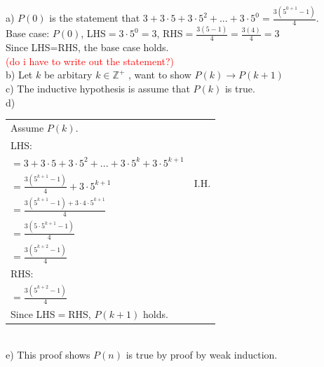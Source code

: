 \documentclass[12pt]{exam}
\begin{document}
\begin{solution}
	a) $P(0)$ is the statement that $3 + 3 \cdot 5 + 3 \cdot 5^2 + ... + 3 \cdot 5^0 = \frac{3 (5^{0+1} - 1)}{4}$.\\
	Base case: $P(0)$, LHS$=3 \cdot 5^0=3$, RHS$=\frac{3(5-1)}{4}=\frac{3(4)}{4}=3$\\
	Since LHS=RHS, the base case holds.\\
	\textcolor{red}{ (do i have to write out the statement?)}
	\\ b) Let $k$ be arbitary $ k \in \mathbb{Z}^+$ , want to show $P(k) \rightarrow P(k+1)$\\
	c) The inductive hypothesis is assume that $P(k)$ is true.\\
	d)\\
	\begin{tabular}{ll}
		Assume $P(k)$.                                                       \\
		LHS:                                                                 \\
		$=3 + 3 \cdot 5 + 3 \cdot 5^2 + ... +3 \cdot 5^{k}+ 3 \cdot 5^{k+1}$ \\
		$=\frac{3 (5^{k+1} - 1)}{4}+3 \cdot 5^{k+1}$ & I.H.                  \\
		$=\frac{3(5^{k+1}-1)+ 3 \cdot 4 \cdot 5^{k+1}}{4}$                   \\
		$=\frac{3(5\cdot 5^{k+1}-1)}{4}$                                     \\
		$=\frac{3(5^{k+2}-1)}{4}$                                            \\
		RHS:                                                                 \\
		$=\frac{3(5^{k+2}-1)}{4}$                                            \\
		Since LHS$=$RHS, $P(k+1)$ holds.
	\end{tabular}
	\\e) This proof shows $P(n)$ is true by proof by weak induction.
\end{solution}
\end{document}
